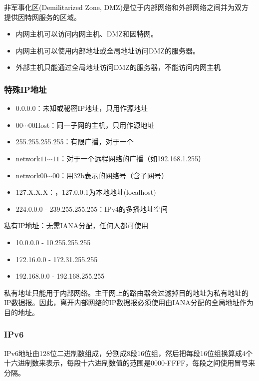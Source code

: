 非军事化区(Demilitarized Zone, DMZ)是位于内部网络和外部网络之间并为双方提供因特网服务的区域。
\begin{itemize}
\item 内网主机可以访问内网主机、DMZ和因特网。
\item 内网主机可以使用内部地址或全局地址访问DMZ的服务器。
\item 外部主机只能通过全局地址访问DMZ的服务器，不能访问内网主机
\end{itemize}

\subsubsection{特殊IP地址}
\begin{itemize}
	\item 0.0.0.0：未知或秘密IP地址，只用作源地址
	\item $00\cdots00$Host：同一子网的主机，只用作源地址
	\item 255.255.255.255：有限广播，对于一个
	\item network$11\cdots11$：对于一个远程网络的广播（如192.168.1.255）
	\item network$00\cdots00$：用32b表示的网络号（含子网号）
	\item 127.X.X.X：，127.0.0.1为本地地址(localhost)
	\item 224.0.0.0 - 239.255.255.255：IPv4的多播地址空间
\end{itemize}

私有IP地址：无需IANA分配，任何人都可使用
\begin{itemize}
	\item 10.0.0.0 - 10.255.255.255
	\item 172.16.0.0 - 172.31.255.255
	\item 192.168.0.0 - 192.168.255.255
\end{itemize}
私有地址只能用于内部网络。主干网上的路由器会过滤掉目的地址为私有地址的IP数据报。因此，离开内部网络的IP数据报必须使用由IANA分配的全局地址作为目的地址。

\subsubsection{IPv6}
IPv6地址由128位二进制数组成，分割成8段16位组，然后把每段16位组换算成4个十六进制数来表示，每段十六进制数值的范围是0000-FFFF，每段之间使用冒号来分隔。

